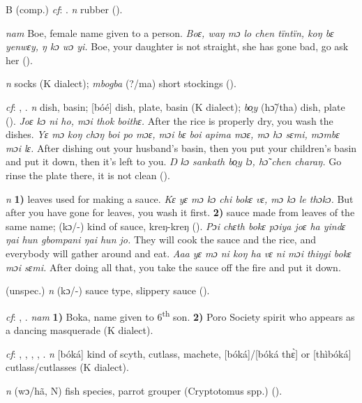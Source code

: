 \begin{letter}{B}
 (comp.) \textit{cf}: . \textit{n} rubber (\citealt{Pichl1967}). 

 \textit{nam} Boe, female name given to a person. \textit{Boɛ, waŋ mɔ lo chen tïntïn, koŋ bɛ yenwɛy, ŋ kɔ wɔ yi.} Boe, your daughter is not straight, she has gone bad, go ask her (\citealt{Pichl1967}). 

 \textit{n} socks (K dialect); \textit{mbogba} (?/ma) short stockings (\citealt{Pichl1967}). 

 \textit{cf}: , . \textit{n} dish, basin; [bóé] dish, plate, basin (K dialect); \textit{bo̹y} (hɔ̃/tha) dish, plate (\citealt{Pichl1967}). \textit{Joɛ kɔ ni ho, mɔi thok boithɛ.} After the rice is properly dry, you wash the dishes. \textit{Yɛ mɔ koŋ chɔŋ boi po mɔɛ, mɔi bɛ boi apima mɔɛ, mɔ hɔ sɛmi, mɔmbɛ mɔi lɛ.} After dishing out your husband's basin, then you put your children's basin and put it down, then it's left to you. \textit{Ŋ kɔ sankath bo̹y lɔ, hɔ̃ chen charaŋ.} Go rinse the plate there, it is not clean (\citealt{Pichl1967}). 

 \textit{n} \textbf{1)} leaves used for making a sauce. \textit{Kɛ yɛ mɔ kɔ chi bokɛ vɛ, mɔ kɔ le thɔkɔ.} But after you have gone for leaves, you wash it first. \textbf{2)} sauce made from leaves of the same name; (kɔ/-) kind of sauce, kreŋ-kreŋ (\citealt{Pichl1967}). \textit{Pɔi chɛth bokɛ pɔiya joɛ ha yindɛ ŋai hun gbompani ŋai hun jo.} They will cook the sauce and the rice, and everybody will gather around and eat. \textit{Aaa yɛ mɔ ni koŋ ha vɛ ni mɔi thiŋgi bokɛ mɔi sɛmi.} After doing all that, you take the sauce off the fire and put it down.

 (unspec.) \textit{n} (kɔ/\nobreakdash-) sauce type, slippery sauce (\citealt{Pichl1967}). 

 \textit{cf}: , . \textit{nam} \textbf{1)} Boka, name given to 6\textsuperscript{th} son. \textbf{2)} Poro Society spirit who appears as a dancing masquerade (K dialect). 

 \textit{cf}: , , , , . \textit{n} [bóká] kind of scyth, cutlass, machete, [bóká]/[bóká thɛ̀] or [thìbóká] cutlass/cutlasses (K dialect). 

 \textit{n} (wɔ/hã, N) fish species, parrot grouper (Cryptotomus spp.) (\citealt{Pichl1967}). 


\end{letter}
